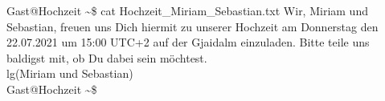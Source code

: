 \documentclass[12pt, a5paper]{article}
\begin{document}
\noindent
{\selectfont
\lbrack Gast@Hochzeit \textasciitilde\rbrack\$ cat Hochzeit\_Miriam\_Sebastian.txt
Wir, Miriam und Sebastian, freuen uns Dich hiermit zu unserer Hochzeit am Donnerstag den 22.07.2021 um 15:00 UTC+2 auf der Gjaidalm einzuladen. Bitte teile uns baldigst mit, ob Du dabei sein möchtest.\\ lg(Miriam und Sebastian) \\
\lbrack Gast@Hochzeit \textasciitilde\rbrack\$\\
\hspace*{-0.7in}
}
\end{document}
